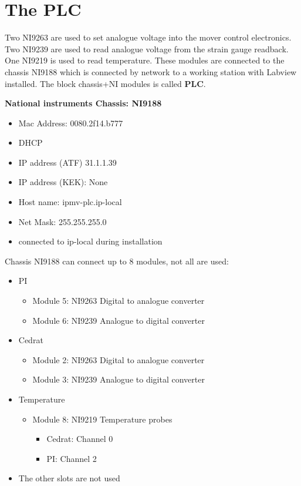 \section{The PLC}
Two NI9263 are used to set analogue voltage into the mover control electronics. Two NI9239 are used to read analogue voltage from the strain gauge readback. One NI9219 is used to read temperature. These modules are connected to the chassis NI9188 which is connected by network to a working station with Labview installed.
The block chassis+NI modules is called \textbf{PLC}.\par
\textbf{National instruments Chassis: NI9188}
\begin{itemize}
\item Mac Address: 0080.2f14.b777
\item DHCP
\item IP address (ATF) 31.1.1.39
\item IP address (KEK): None
\item Host name: ipmv-plc.ip-local
\item Net Mask: 255.255.255.0
\item connected to ip-local during installation
\end{itemize}
Chassis NI9188 can connect up to 8 modules, not all are used:
\begin{itemize}
\item PI
\begin{itemize}
\item Module 5: NI9263 Digital to analogue converter
\item Module 6: NI9239 Analogue to digital converter
\end{itemize}
\item Cedrat
\begin{itemize}
\item Module 2: NI9263 Digital to analogue converter
\item Module 3: NI9239 Analogue to digital converter
\end{itemize}
\item Temperature
\begin{itemize}
\item Module 8: NI9219 Temperature probes
\begin{itemize}
\item Cedrat: 	Channel 0
\item PI: Channel 2
\end{itemize}
\end{itemize}
\item The other slots are not used
\end{itemize}

